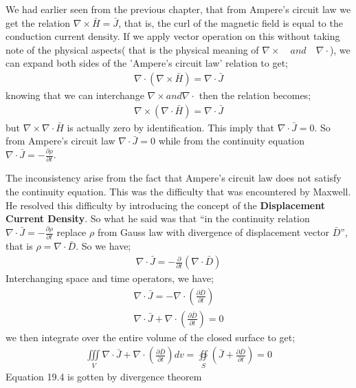 We had earlier seen from the previous chapter, that from Ampere's circuit law we get the relation $\nabla\times\bar{H}=\bar{J}$, that is, the curl of the magnetic field is equal to the conduction current density. If we apply vector operation on this without taking note of the physical aspects( that is the physical meaning of $\nabla\times\quad and\quad \nabla\cdot$), we can expand both sides of the 'Ampere's circuit law' relation to get;
\begin{align}
\nabla\cdot(\nabla\times\bar{H})=\nabla\cdot\bar{J}
\end{align}
knowing that we can interchange $\nabla\times and  \nabla\cdot$ then the relation becomes;
\begin{align}
\nabla\times(\nabla\cdot\bar{H})=\nabla\cdot\bar{J}
\end{align}
but $\nabla\times\nabla\cdot\bar{H}$ is actually zero by identification. This imply that $\nabla\cdot\bar{J}=0$. So from Ampere's circuit law $\nabla\cdot\bar{J}=0$ while from the continuity equation  $\nabla\cdot\bar{J}=-\frac{\partial\rho}{\partial t}$.

The inconsistency arise from the fact that Ampere's circuit law does not satisfy the continuity equation. This was the difficulty that was encountered by Maxwell. He resolved this difficulty  by introducing the concept of the \textbf{Displacement Current Density}. So what he said was that  \textquotedblleft in the continuity relation $\nabla\cdot\bar{J}=-\frac{\partial\rho}{\partial t}$ replace $\rho$ from Gauss law with divergence of displacement vector $\bar{D}$\textquotedblright, that is $\rho=\nabla\cdot\bar{D}$. So we have;
\begin{align}
\nabla\cdot\bar{J}=-\frac{\partial}{\partial t}(\nabla\cdot\bar{D})
\end{align}
Interchanging space and time operators, we have;
\begin{align}
\nabla\cdot\bar{J}=-\nabla\cdot(\frac{\partial\bar{D}}{\partial t})\\
\nabla\cdot\bar{J}+\nabla\cdot(\frac{\partial\bar{D}}{\partial t}) = 0
\end{align}
we then integrate over the entire volume of the closed surface to get;
\begin{align}
\iiint\limits_V\nabla\cdot\bar{J}+\nabla\cdot(\frac{\partial\bar{D}}{\partial t})dv=
\oiint\limits_S(\bar{J}+\frac{\partial\bar{D}}{\partial t})=0
\end{align}
Equation 19.4 is gotten by divergence theorem


